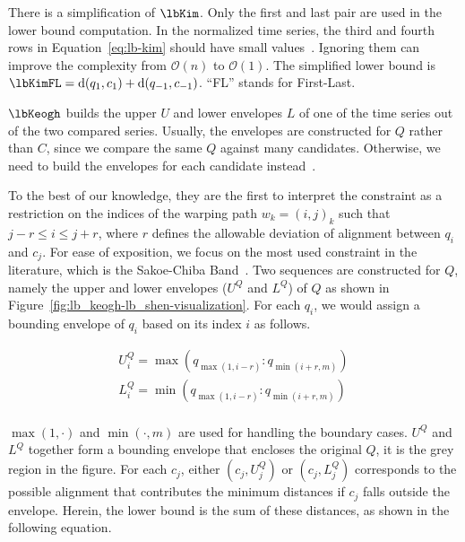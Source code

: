 There is a simplification of $\lbKim$. Only the first and last pair are used in the lower bound computation. In the normalized time series, the third and fourth rows in Equation~\ref{eq:lb-kim} should have small values~\cite{rakthanmanon2013addressing}. Ignoring them can improve the complexity from $\mathcal{O}(n)$ to $\mathcal{O}(1)$.
The simplified lower bound is $\lbKimFL = \operatorname{d}(q_1, c_1) + \operatorname{d}(q_{-1}, c_{-1})$.
``FL'' stands for First-Last.

\noindent{} $\lbKeogh$ builds the upper $U$ and lower envelopes $L$ of one of the time series out of the two compared series.
Usually, the envelopes are constructed for $Q$ rather than $C$, since we compare the same $Q$ against many candidates. 
Otherwise, we need to build the envelopes for each candidate instead~\cite{rakthanmanon2013addressing}. 


To the best of our knowledge, they are the first to interpret the constraint as a restriction on the indices of the warping path $w_k = (i, j)_k$ such that $j - r \leq i \leq j + r$, where $r$ defines the allowable deviation of alignment between $q_i$ and $c_j$.
For ease of exposition, we focus on the most used constraint in the literature, which is the Sakoe-Chiba Band~\cite{tan2018efficient}.
Two sequences are constructed for $Q$, namely the upper and lower envelopes ($U^Q$ and $L^Q$) of $Q$ as shown in Figure~\ref{fig:lb_keogh-lb_shen-visualization}.
For each $q_i$, we would assign a bounding envelope of $q_i$ based on its index $i$ as follows.

\begin{equation}
    \label{eq:lb_keogh-envelope}
    \begin{aligned}
        U_i^Q = \max(q_{\max(1,i-r)}:q_{\min(i+r,m)}) \\
        L_i^Q = \min(q_{\max(1,i-r)}:q_{\min(i+r,m)}) \\
    \end{aligned}
\end{equation}

$\max(1, \cdot)$ and $\min(\cdot, m)$ are used for handling the boundary cases.
$U^Q$ and $L^Q$ together form a bounding envelope that encloses the original $Q$, it is the grey region in the figure.
For each $c_j$, either $(c_j, U_j^Q)$ or $(c_j, L_j^Q)$ corresponds to the possible alignment that contributes the minimum distances if $c_j$ falls outside the envelope.
Herein, the lower bound is the sum of these distances, as shown in the following equation.

